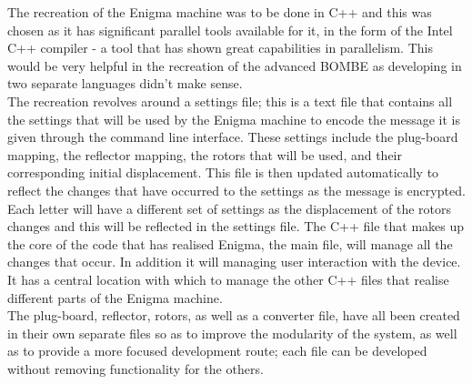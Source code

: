 \documentclass[12pt,a4paper]{article}
\begin{document}
The recreation of the Enigma machine was to be done in C++ and this was chosen as it has significant parallel tools available for it, in the form of the Intel C++ compiler - a tool that has shown great capabilities in parallelism. This would be very helpful in the recreation of the advanced BOMBE as developing in two separate languages didn't make sense.\\

The recreation revolves around a settings file; this is a text file that contains all the settings that will be used by the Enigma machine to encode the message it is given through the command line interface. These settings include the plug-board mapping, the reflector mapping, the rotors that will be used, and their corresponding initial displacement. This file is then updated automatically to reflect the changes that have occurred to the settings as the message is encrypted. Each letter will have a different set of settings as the displacement of the rotors changes and this will be reflected in the settings file. The C++ file that makes up the core of the code that has realised Enigma, the main file, will manage all the changes that occur. In addition it will managing user interaction with the device. It has a central location with which to manage the other C++ files that realise different parts of the Enigma machine.\\

The plug-board, reflector, rotors, as well as a converter file, have all been created in their own separate files so as to improve the modularity of the system, as well as to provide a more focused development route; each file can be developed without removing functionality for the others.\\
\end{document}
